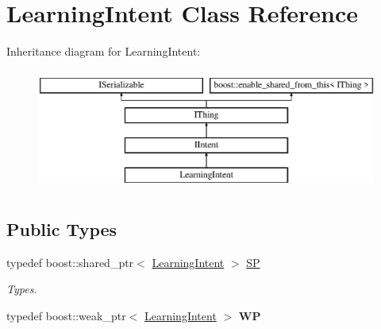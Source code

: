 \hypertarget{class_learning_intent}{}\section{Learning\+Intent Class Reference}
\label{class_learning_intent}
Inheritance diagram for Learning\+Intent\+:\begin{figure}[H]
\begin{center}
\leavevmode
\includegraphics[height=4.000000cm]{class_learning_intent}
\end{center}
\end{figure}
\subsection*{Public Types}
\begin{DoxyCompactItemize}
\item 
\mbox{\label{class_learning_intent_abaffa9bca5379d9667976591a6eda2c3}} 
typedef boost\+::shared\+\_\+ptr$<$ \hyperlink{class_learning_intent}{Learning\+Intent} $>$ \hyperlink{class_learning_intent_abaffa9bca5379d9667976591a6eda2c3}{SP}
\begin{DoxyCompactList}\small\item\em Types. \end{DoxyCompactList}\item 
\mbox{\label{class_learning_intent_a9172237de20dd4300482075fcedb1551}} 
typedef boost\+::weak\+\_\+ptr$<$ \hyperlink{class_learning_intent}{Learning\+Intent} $>$ {\bfseries WP}
\end{DoxyCompactItemize}
